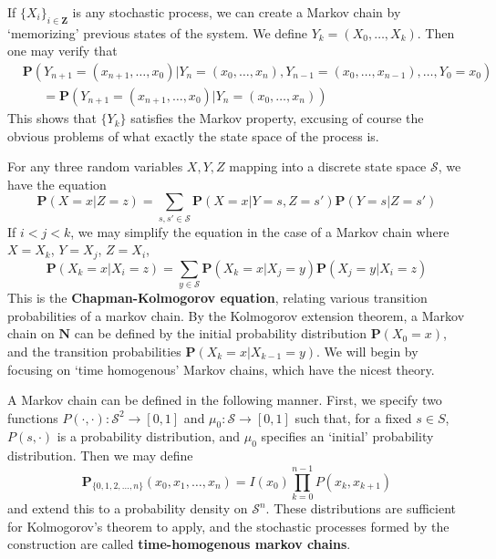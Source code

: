\begin{example}
    If $\{X_i\}_{i \in \mathbf{Z}}$ is any stochastic process, we can create a Markov chain by `memorizing' previous states of the system. We define $Y_k = (X_0, \dots, X_k)$. Then one may verify that
    \begin{align*} &\mathbf{P}(Y_{n+1} = (x_{n+1}, \dots, x_0) | Y_n = (x_0, \dots, x_n), Y_{n-1} = (x_0, \dots, x_{n-1}), \dots, Y_0 = x_0)\\
    &\ \ \ \ \ \ \ = \mathbf{P}(Y_{n+1} = (x_{n+1}, \dots, x_0) | Y_n = (x_0, \dots, x_n)) \end{align*}
    This shows that $\{ Y_k \}$ satisfies the Markov property, excusing of course the obvious problems of what exactly the state space of the process is.
\end{example}

For any three random variables $X,Y,Z$ mapping into a discrete state space $\mathcal{S}$, we have the equation
%
\[ \mathbf{P}(X = x | Z = z) = \sum_{s,s' \in \mathcal{S}} \mathbf{P}(X = x | Y = s, Z = s') \mathbf{P}(Y = s | Z = s') \]
%
If $i < j < k$, we may simplify the equation in the case of a Markov chain where $X = X_k$, $Y = X_j$, $Z = X_i$,
%
\[ \mathbf{P}(X_k = x | X_i = z) = \sum_{y \in \mathcal{S}} \mathbf{P}(X_k = x | X_j = y) \mathbf{P}(X_j = y | X_i = z) \]
%
This is the {\bf Chapman-Kolmogorov equation}, relating various transition probabilities of a markov chain. By the Kolmogorov extension theorem, a Markov chain on $\mathbf{N}$ can be defined by the initial probability distribution $\mathbf{P}(X_0 = x)$, and the transition probabilities $\mathbf{P}(X_k = x | X_{k - 1} = y)$. We will begin by focusing on `time homogenous' Markov chains, which have the nicest theory.

\begin{definition}
    A Markov chain can be defined in the following manner. First, we specify two functions $P(\cdotp,\cdotp):\mathcal S^2 \to [0,1]$ and $\mu_0: \mathcal S \to [0,1]$ such that, for a fixed $s \in S$, $P(s,\cdot)$ is a probability distribution, and $\mu_0$ specifies an `initial' probability distribution. Then we may define
    \[ \mathbf{P}_{\{0, 1, 2, \dots, n\}}(x_0, x_1, \dots, x_n) = I(x_0) \prod_{k = 0}^{n-1} P(x_k,x_{k+1}) \]
    and extend this to a probability density on $\mathcal S^n$. These distributions are sufficient for Kolmogorov's theorem to apply, and the stochastic processes formed by the construction are called {\bf time-homogenous markov chains}.
\end{definition}

